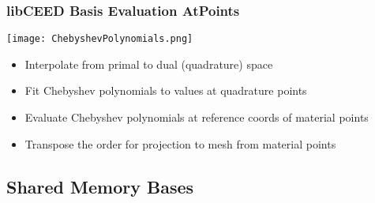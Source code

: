 \documentclass{beamer}
\begin{document}

\begin{frame}
\begin{center}
\frametitle{libCEED Basis Evaluation AtPoints}

\begin{center}
\texttt{[image: ChebyshevPolynomials.png]}
\end{center}

\begin{itemize}

\item Interpolate from primal to dual (quadrature) space\\

\item Fit Chebyshev polynomials to values at quadrature points\\

\item Evaluate Chebyshev polynomials at reference coords of material points\\

\item Transpose the order for projection to mesh from material points\\

\end{itemize}

\end{center}
\end{frame}

\subsection{Shared Memory Bases}
\end{document}

